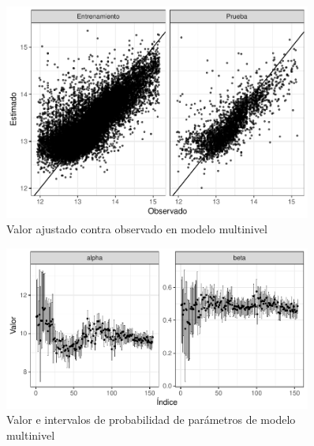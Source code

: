\begin{figure}[H]
    \centering
    \includegraphics[width=0.9\textwidth]{images/three_levels_obs_vs_pred.pdf}
    \caption{Valor ajustado contra observado en modelo multinivel}
    \label{fig:three_levels_obs_vs_pred}
\end{figure}

\begin{figure}[H]
    \centering
    \includegraphics[width=0.9\textwidth]{images/three_levels_param_values.pdf}
    \caption{Valor e intervalos de probabilidad de parámetros de modelo multinivel}
    \label{fig:three_levels_param_values}
\end{figure}
